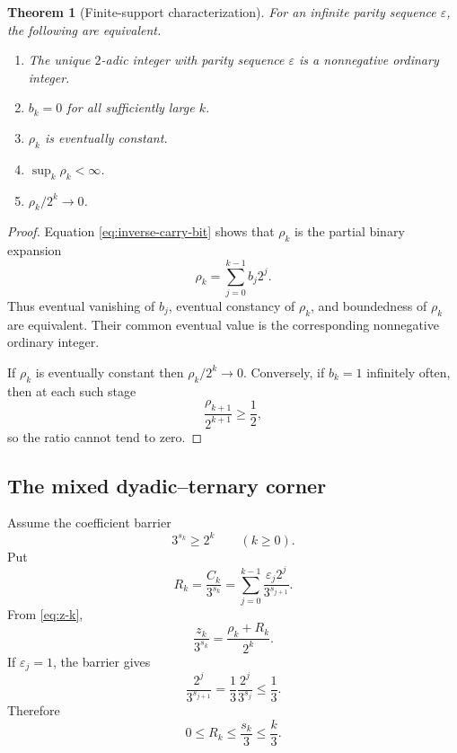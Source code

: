 \documentclass[11pt,reqno]{amsart}
\numberwithin{equation}{section}
\newtheorem{theorem}{Theorem}[section]
\theoremstyle{definition}
\theoremstyle{remark}
\newcommand{\eps}{\varepsilon}
\begin{document}
\begin{theorem}[Finite-support characterization]\label{thm:finite-support}
For an infinite parity sequence $\eps$, the following are equivalent.
\begin{enumerate}[label=(\roman*),leftmargin=2.3em]
\item The unique $2$-adic integer with parity sequence $\eps$ is a
      nonnegative ordinary integer.
\item $b_k=0$ for all sufficiently large $k$.
\item $\rho_k$ is eventually constant.
\item $\sup_k\rho_k<\infty$.
\item $\rho_k/2^k\to0$.
\end{enumerate}
\end{theorem}

\begin{proof}
Equation \eqref{eq:inverse-carry-bit} shows that $\rho_k$ is the partial
binary expansion
\[
\rho_k=\sum_{j=0}^{k-1}b_j2^j.
\]
Thus eventual vanishing of $b_j$, eventual constancy of $\rho_k$, and
boundedness of $\rho_k$ are equivalent.  Their common eventual value is the
corresponding nonnegative ordinary integer.

If $\rho_k$ is eventually constant then $\rho_k/2^k\to0$.  Conversely, if
$b_k=1$ infinitely often, then at each such stage
\[
\frac{\rho_{k+1}}{2^{k+1}}\ge\frac12,
\]
so the ratio cannot tend to zero.
\end{proof}

\subsection{The mixed dyadic--ternary corner}

Assume the coefficient barrier
\begin{equation}\label{eq:shortcut-barrier}
3^{s_k}\ge2^k
\qquad(k\ge0).
\end{equation}
Put
\begin{equation}\label{eq:Rk-carry}
R_k=\frac{C_k}{3^{s_k}}
=
\sum_{j=0}^{k-1}
\frac{\eps_j2^j}{3^{s_{j+1}}}.
\end{equation}
From \eqref{eq:z-k},
\begin{equation}\label{eq:corner-identity}
\frac{z_k}{3^{s_k}}
=
\frac{\rho_k+R_k}{2^k}.
\end{equation}
If $\eps_j=1$, the barrier gives
\[
\frac{2^j}{3^{s_{j+1}}}
=
\frac13\frac{2^j}{3^{s_j}}
\le\frac13.
\]
Therefore
\[
0\le R_k\le\frac{s_k}{3}\le\frac{k}{3}.
\]
\end{document}
